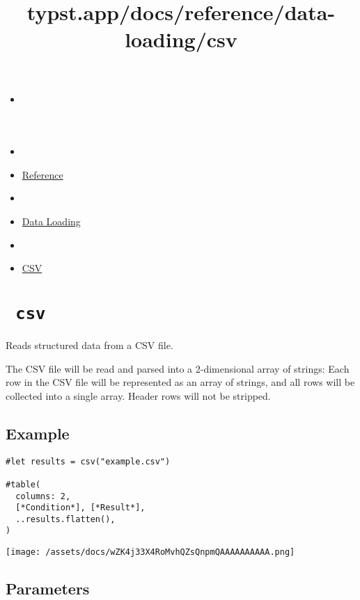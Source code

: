 \title{typst.app/docs/reference/data-loading/csv}

\begin{itemize}
\tightlist
\item
  \href{/docs}{}
\item
  
\item
  \href{/docs/reference/}{Reference}
\item
  
\item
  \href{/docs/reference/data-loading/}{Data Loading}
\item
  
\item
  \href{/docs/reference/data-loading/csv/}{CSV}
\end{itemize}

\section{\texorpdfstring{\texttt{\ csv\ }}{ csv }}\label{summary}

Reads structured data from a CSV file.

The CSV file will be read and parsed into a 2-dimensional array of
strings: Each row in the CSV file will be represented as an array of
strings, and all rows will be collected into a single array. Header rows
will not be stripped.

\subsection{Example}\label{example}

\begin{verbatim}
#let results = csv("example.csv")

#table(
  columns: 2,
  [*Condition*], [*Result*],
  ..results.flatten(),
)
\end{verbatim}

\texttt{[image: /assets/docs/wZK4j33X4RoMvhQZsQnpmQAAAAAAAAAA.png]}

\subsection{\texorpdfstring{{ Parameters
}}{ Parameters }}\label{parameters}

